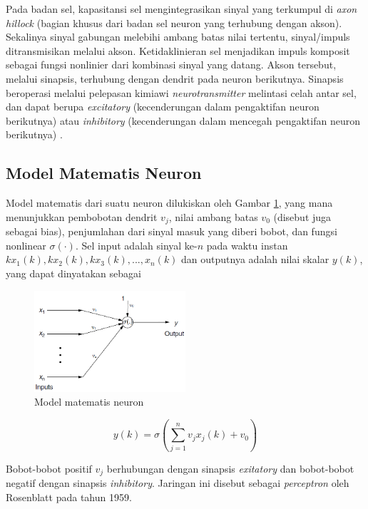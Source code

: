 Pada badan sel, kapasitansi sel mengintegrasikan sinyal yang terkumpul di \textit{axon hillock} (bagian khusus dari badan sel neuron yang terhubung dengan akson). Sekalinya sinyal gabungan melebihi ambang batas nilai tertentu, sinyal/impuls ditransmisikan melalui akson. Ketidaklinieran sel menjadikan impuls komposit sebagai fungsi nonlinier dari kombinasi sinyal yang datang. Akson tersebut, melalui sinapsis, terhubung dengan dendrit pada neuron berikutnya. Sinapsis beroperasi melalui pelepasan kimiawi \textit{neurotransmitter} melintasi celah antar sel, dan dapat berupa \textit{excitatory} (kecenderungan dalam pengaktifan neuron berikutnya) atau \textit{inhibitory} (kecenderungan dalam mencegah pengaktifan neuron berikutnya) \cite{NNControlBook}.

\subsection{Model Matematis Neuron}

Model matematis dari suatu neuron dilukiskan oleh Gambar \ref{fig:3:math}, yang mana menunjukkan pembobotan dendrit $v_j$, nilai ambang batas $v_0$ (disebut juga sebagai bias), penjumlahan dari sinyal masuk yang diberi bobot, dan fungsi nonlinear $\sigma(\cdot)$. Sel input adalah sinyal ke-$n$ pada waktu instan 	$kx_1(k), kx_2(k), kx_3(k),...,x_n(k)$ dan outputnya adalah nilai skalar $y(k)$, yang dapat dinyatakan sebagai

\begin{figure}[!h]
	\centering
	\includegraphics[width=0.5\textwidth]{figures/neuronmath}
	\caption{Model matematis neuron \cite{NNControlBook}}
	\label{fig:3:math}
\end{figure}

\begin{equation} \label{eq:3:perceptron}
y(k) = \sigma \left( \sum_{j=1}^{n}v_jx_j(k)+v_0 \right)
\end{equation}

Bobot-bobot positif  $v_j$ berhubungan dengan sinapsis \textit{exitatory} dan bobot-bobot negatif dengan sinapsis \textit{inhibitory}. Jaringan ini disebut sebagai \textit{perceptron} oleh Rosenblatt pada tahun 1959. \cite{NNControlBook}


